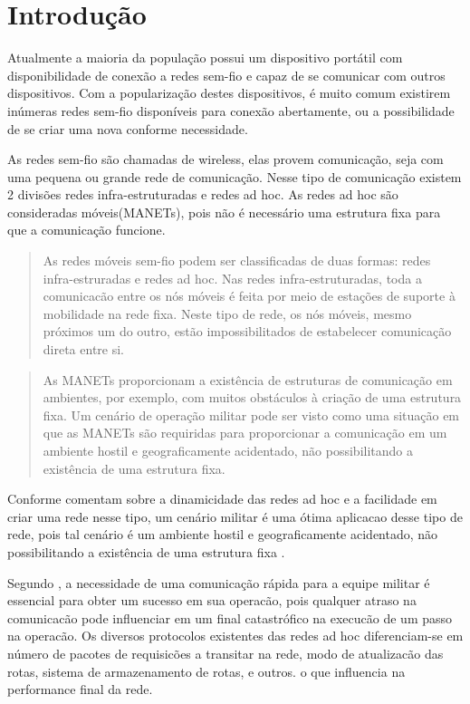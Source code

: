 \section{Introdu\c{c}\~ao} 

Atualmente a maioria da popula\c{c}\~ao possui um dispositivo port\'atil com disponibilidade de conex\~ao a redes sem-fio e capaz de se comunicar com outros dispositivos. Com a populariza\c{c}\~ao destes dispositivos, \'e muito comum existirem in\'umeras redes sem-fio dispon\'iveis para conex\~ao abertamente, ou a possibilidade de se criar uma nova conforme necessidade.

As redes sem-fio s\~ao chamadas de wireless, elas provem comunica\c{c}\~ao, seja com uma pequena ou grande rede de comunica\c{c}\~ao. Nesse tipo de comunica\c{c}\~ao existem 2 divis\~oes redes infra-estruturadas e redes ad hoc. As redes ad hoc s\~ao consideradas m\'oveis(MANETs), pois n\~ao \'e necess\'ario uma estrutura fixa para que a comunica\c{c}\~ao funcione.

\begin{quote}
As redes m\'oveis sem-fio podem ser classificadas de duas formas: redes infra-estruradas e redes ad hoc. Nas redes infra-estruturadas, toda a comunicac\~ao entre os n\'os m\'oveis \'e feita por meio de esta\c{c}\~oes de suporte \`a mobilidade na rede fixa. Neste tipo de rede, os n\'os m\'oveis, mesmo pr\'oximos um do outro, est\~ao impossibilitados de estabelecer comunica\c{c}\~ao direta entre si.
\end{quote}

\begin{quote}
As MANETs proporcionam a exist\^encia de estruturas de comunica\c{c}\~ao em ambientes, por exemplo, com muitos obst\'aculos \`a cria\c{c}\~ao de uma estrutura fixa. Um cen\'ario de opera\c{c}\~ao militar pode ser visto como uma situa\c{c}\~ao em que as MANETs s\~ao requiridas para proporcionar a comunica\c{c}\~ao em um ambiente hostil e geograficamente acidentado, n\~ao possibilitando a exist\^encia de uma estrutura fixa.\cite{brignoni}
\end{quote}

Conforme \cite{pepe} comentam sobre a dinamicidade das redes ad hoc e a facilidade em criar uma rede nesse tipo, um cen\'ario militar \'e uma \'otima aplicacao desse tipo de rede, pois tal cen\'ario \'e um ambiente hostil e geograficamente acidentado, n\~ao possibilitando a exist\^encia de uma estrutura fixa \cite{schimidt}.

Segundo \cite{salles}, a necessidade de uma comunica\c{c}\~ao r\'apida para a equipe militar \'e essencial para obter um sucesso em sua operac\~ao, pois qualquer atraso na comunicac\~ao pode influenciar em um final catastr\'ofico na execuc\~ao de um passo na operac\~ao. Os diversos protocolos existentes das redes ad hoc diferenciam-se em n\'umero de pacotes de requisic\~oes a transitar na rede, modo de atualizac\~ao das rotas, sistema de armazenamento de rotas, e outros. o que influencia na performance final da rede.
